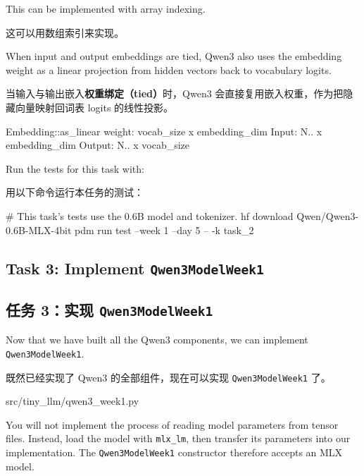 \documentclass[11pt,a4paper]{article}
\newenvironment{zhpar}{%
  \par\smallskip\begingroup\color{zhcolor}\small\ignorespaces%
}{\endgroup\par\smallskip}
\begin{document}
This can be implemented with array indexing.

\begin{zhpar}
这可以用数组索引来实现。
\end{zhpar}
When input and output embeddings are tied, Qwen3 also uses the embedding weight as a linear projection from hidden vectors back to vocabulary logits.

\begin{zhpar}
当输入与输出嵌入\textbf{权重绑定（tied）}时，Qwen3 会直接复用嵌入权重，作为把隐藏向量映射回词表 logits 的线性投影。
\end{zhpar}
\begin{codeblock}
Embedding::as_linear
weight: vocab_size x embedding_dim
Input: N.. x embedding_dim
Output: N.. x vocab_size
\end{codeblock}

Run the tests for this task with:

\begin{zhpar}
用以下命令运行本任务的测试：
\end{zhpar}
\begin{codeblock}
# This task's tests use the 0.6B model and tokenizer.
hf download Qwen/Qwen3-0.6B-MLX-4bit
pdm run test --week 1 --day 5 -- -k task_2
\end{codeblock}

\subsection*{Task 3: Implement \texttt{Qwen3ModelWeek1}}

\subsection*{任务 3：实现 \texttt{Qwen3ModelWeek1}}

Now that we have built all the Qwen3 components, we can implement \texttt{Qwen3ModelWeek1}.

\begin{zhpar}
既然已经实现了 Qwen3 的全部组件，现在可以实现 \texttt{Qwen3ModelWeek1} 了。
\end{zhpar}
\begin{codeblock}
src/tiny_llm/qwen3_week1.py
\end{codeblock}

You will not implement the process of reading model parameters from tensor files. Instead, load the model with \texttt{mlx\_lm}, then transfer its parameters into our implementation. The \texttt{Qwen3ModelWeek1} constructor therefore accepts an MLX model.
\end{document}
